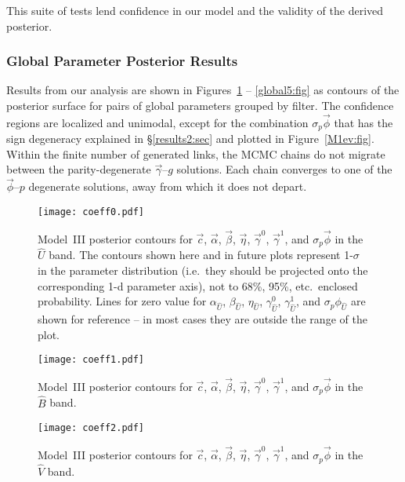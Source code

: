 \documentclass[trackchanges]{aastex62}   	%
\begin{document}
This suite of tests lend confidence in our model and the validity of the derived posterior.

\subsubsection{Global Parameter Posterior Results}
\label{results3global:sec}
Results from our analysis are shown in Figures~\ref{global1:fig} -- \ref{global5:fig}
as contours of the posterior surface for pairs of global parameters grouped by filter.
The confidence regions are localized and unimodal, except for the combination $\sigma_p \vec{\phi}$ that
has the sign degeneracy explained in \S\ref{results2:sec} and plotted in Figure~\ref{M1ev:fig}.
Within the finite number of generated links, the MCMC chains do not migrate between the parity-degenerate $\vec{\gamma}$--$g$ solutions.
Each chain converges to one of the  $\vec{\phi}$--$p$ degenerate solutions, away from which it does not depart.  

\begin{figure}[htbp] %
   \centering
   \texttt{[image: coeff0.pdf]} 
            \caption{Model~III posterior contours for $\vec{c}$, $\vec{\alpha}$, $\vec{\beta}$, $\vec{\eta}$, $\vec{\gamma}^0$, $\vec{\gamma}^1$, and $\sigma_p \vec{\phi}$ in the ${\hat{U}}$ band.
            The contours shown here and in future plots represent 1-$\sigma$ in the parameter distribution (i.e.\ they should be
            projected onto the corresponding 1-d parameter axis), not to 68\%, 95\%, etc.\
            enclosed probability.  Lines for zero value for $\alpha_{\hat{U}}$, $\beta_{\hat{U}}$, $\eta_{\hat{U}}$, $\gamma_{\hat{U}}^0$, $\gamma_{\hat{U}}^1$, and $\sigma_p \phi_{\hat{U}}$ are shown for reference --
            in most cases they are outside the range of the plot.
            \label{global1:fig}}
\end{figure}

\begin{figure}[htbp] %
   \centering
   \texttt{[image: coeff1.pdf]} 
            \caption{Model~III posterior contours for $\vec{c}$, $\vec{\alpha}$, $\vec{\beta}$, $\vec{\eta}$,  $\vec{\gamma}^0$, $\vec{\gamma}^1$, and $\sigma_p \vec{\phi}$ in the ${\hat{B}}$ band.
 \label{global2:fig}}
\end{figure}

\begin{figure}[htbp] %
   \centering
   \texttt{[image: coeff2.pdf]} 
            \caption{Model~III posterior contours for $\vec{c}$, $\vec{\alpha}$, $\vec{\beta}$, $\vec{\eta}$, $\vec{\gamma}^0$, $\vec{\gamma}^1$, and $\sigma_p \vec{\phi}$ in the ${\hat{V}}$ band.
 \label{global3:fig}}
\end{figure}
\end{document}
